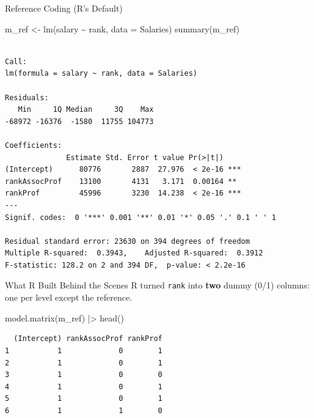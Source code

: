 \documentclass[
  ignorenonframetext,
  aspectratio=169,
]{beamer}
\newenvironment{Shaded}{\begin{snugshade}}{\end{snugshade}}
\newcommand{\AttributeTok}[1]{\textcolor[rgb]{0.40,0.45,0.13}{#1}}
\newcommand{\FunctionTok}[1]{\textcolor[rgb]{0.28,0.35,0.67}{#1}}
\newcommand{\NormalTok}[1]{\textcolor[rgb]{0.00,0.23,0.31}{#1}}
\newcommand{\OtherTok}[1]{\textcolor[rgb]{0.00,0.23,0.31}{#1}}
\newcommand{\SpecialCharTok}[1]{\textcolor[rgb]{0.37,0.37,0.37}{#1}}
\begin{document}
\begin{frame}[fragile]{Reference Coding (R's Default)}
\protect\hypertarget{sec-ref-coding}{}
\begin{Shaded}
\begin{Highlighting}[]
\NormalTok{m\_ref }\OtherTok{\textless{}{-}} \FunctionTok{lm}\NormalTok{(salary }\SpecialCharTok{\textasciitilde{}}\NormalTok{ rank, }\AttributeTok{data =}\NormalTok{ Salaries)}
\FunctionTok{summary}\NormalTok{(m\_ref)}
\end{Highlighting}
\end{Shaded}

\begingroup\tiny\color{darkgray}

\begin{verbatim}

Call:
lm(formula = salary ~ rank, data = Salaries)

Residuals:
   Min     1Q Median     3Q    Max 
-68972 -16376  -1580  11755 104773 

Coefficients:
              Estimate Std. Error t value Pr(>|t|)    
(Intercept)      80776       2887  27.976  < 2e-16 ***
rankAssocProf    13100       4131   3.171  0.00164 ** 
rankProf         45996       3230  14.238  < 2e-16 ***
---
Signif. codes:  0 '***' 0.001 '**' 0.01 '*' 0.05 '.' 0.1 ' ' 1

Residual standard error: 23630 on 394 degrees of freedom
Multiple R-squared:  0.3943,    Adjusted R-squared:  0.3912 
F-statistic: 128.2 on 2 and 394 DF,  p-value: < 2.2e-16
\end{verbatim}

\endgroup
\end{frame}

\begin{frame}[fragile]{What R Built Behind the Scenes}
\protect\hypertarget{what-r-built-behind-the-scenes}{}
R turned \texttt{rank} into \textbf{two} dummy (0/1) columns: one per
level except the reference.

\begin{Shaded}
\begin{Highlighting}[]
\FunctionTok{model.matrix}\NormalTok{(m\_ref) }\SpecialCharTok{|\textgreater{}} \FunctionTok{head}\NormalTok{()}
\end{Highlighting}
\end{Shaded}

\begingroup\tiny\color{darkgray}

\begin{verbatim}
  (Intercept) rankAssocProf rankProf
1           1             0        1
2           1             0        1
3           1             0        0
4           1             0        1
5           1             0        1
6           1             1        0
\end{verbatim}

\endgroup
\end{frame}
\end{document}
